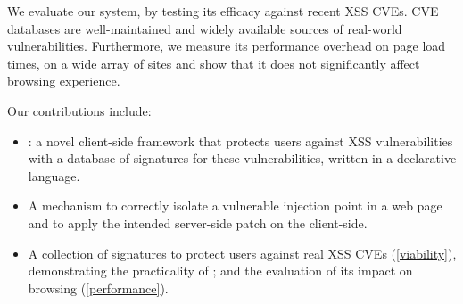 We evaluate our system, by
testing its efficacy against recent \ac{XSS} CVEs. CVE databases are
well-maintained and widely available sources of real-world vulnerabilities.
Furthermore, we measure its performance overhead on page load times,
on a wide array of sites and show that it does not significantly
affect browsing experience.

Our contributions include:
\begin{itemize}

	\item \sys: a novel client-side framework that protects
          users against XSS vulnerabilities with a database of
          signatures for these vulnerabilities, written in a
          declarative language.

	\item A mechanism to correctly isolate a vulnerable injection
          point in a web page and to apply the intended server-side
          patch on the client-side.

	\item A collection of signatures to protect users against
          real XSS CVEs (\autoref{viability}), demonstrating the practicality
          of \sys; and the evaluation of its impact on browsing (\autoref{performance}). %

\end{itemize}
